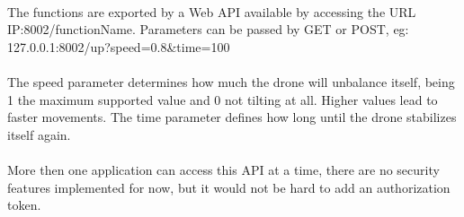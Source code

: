\documentclass[11pt,twoside,a4paper]{article}
\begin{document}
\paragraph {} The functions are exported by a Web API available by accessing
the URL IP:8002/functionName. Parameters can be passed by GET or POST,
eg: 127.0.0.1:8002/up?speed=0.8\&time=100
\paragraph{} The speed parameter determines how much the drone will unbalance
itself, being 1 the maximum supported value and 0 not tilting at all. Higher
values lead to faster movements. The time parameter defines how long until the
drone stabilizes itself again.

\paragraph {} More then one application can access this API at a time, there are
no security features implemented for now, but it would not be hard to add an
authorization token.
\end{document}
